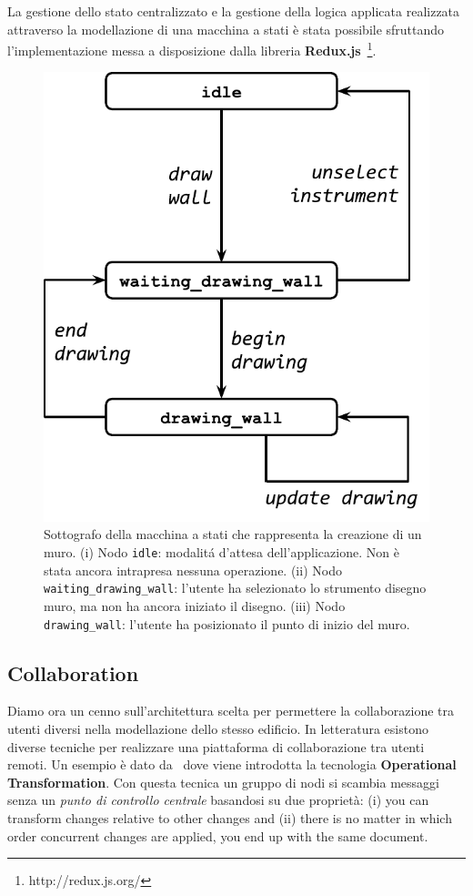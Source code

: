 La gestione dello stato centralizzato e la gestione della logica applicata realizzata  attraverso la modellazione di una macchina a stati è stata possibile sfruttando l'implementazione messa a disposizione dalla libreria \textbf{Redux.js}~\footnote{http://redux.js.org/}.


\begin{figure}[!t]
\centering
\includegraphics[width=0.6\linewidth]{contents/images/uc_draw_wall}

\caption{Sottografo della macchina a stati che rappresenta la creazione di un muro. (i) Nodo \texttt{idle}: modalit\'a d'attesa dell'applicazione. Non è stata ancora intrapresa nessuna operazione. (ii) Nodo \texttt{waiting\_drawing\_wall}: l'utente ha selezionato lo strumento disegno muro, ma non ha ancora iniziato il disegno. (iii) Nodo \texttt{drawing\_wall}: l'utente ha posizionato il punto di inizio del muro.}
\label{fig_uc_draw_wall}
\end{figure}


\subsection{Collaboration}  

Diamo ora un cenno sull'architettura scelta per permettere la collaborazione tra utenti diversi nella modellazione dello stesso edificio. In letteratura esistono diverse tecniche per realizzare una piattaforma di collaborazione tra utenti remoti. Un esempio \`e dato da~\cite{Ellis:1989:CCG:66926.66963} dove viene introdotta la tecnologia \textbf{Operational Transformation}. Con questa tecnica un gruppo di nodi si scambia messaggi senza un \textit{punto di controllo centrale} basandosi su due propriet\`a: (i) you can transform changes relative to other changes and (ii) there is no matter in which order concurrent changes are applied, you end up with the same document.\\


